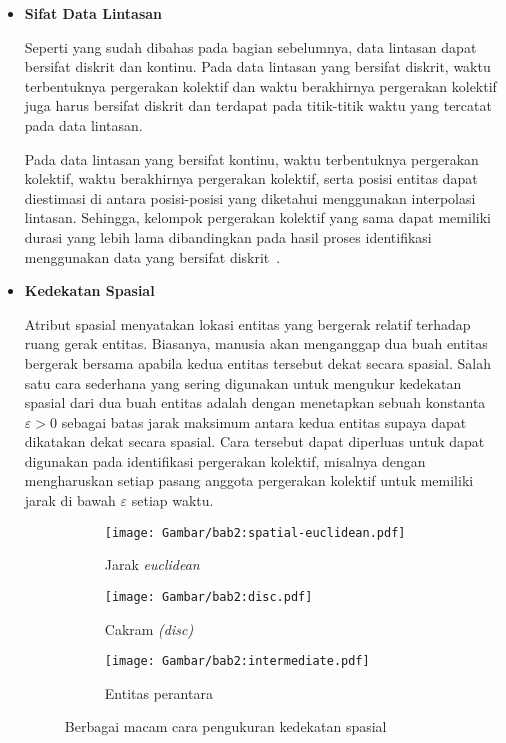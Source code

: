 \begin{itemize}
    \item \textbf{Sifat Data Lintasan}
    
    Seperti yang sudah dibahas pada bagian sebelumnya, data lintasan dapat bersifat diskrit dan kontinu. Pada data lintasan yang bersifat diskrit, waktu terbentuknya pergerakan kolektif dan waktu berakhirnya pergerakan kolektif juga harus bersifat diskrit dan terdapat pada titik-titik waktu yang tercatat pada data lintasan.
    
    Pada data lintasan yang bersifat kontinu, waktu terbentuknya pergerakan kolektif, waktu berakhirnya pergerakan kolektif, serta posisi entitas dapat diestimasi di antara posisi-posisi yang diketahui menggunakan interpolasi lintasan. Sehingga, kelompok pergerakan kolektif yang sama dapat memiliki durasi yang lebih lama dibandingkan pada hasil proses identifikasi menggunakan data yang bersifat diskrit~\cite{wiratma:trajectory}.

    \item \textbf{Kedekatan Spasial}
    
    Atribut spasial menyatakan lokasi entitas yang bergerak relatif terhadap ruang gerak entitas. Biasanya, manusia akan menganggap dua buah entitas bergerak bersama apabila kedua entitas tersebut dekat secara spasial. Salah satu cara sederhana yang sering digunakan untuk mengukur kedekatan spasial dari dua buah entitas adalah dengan menetapkan sebuah konstanta $\varepsilon > 0$ \iffalse \lionov{pake varepsilon ($\varepsilon$)} \fi sebagai batas jarak maksimum antara kedua entitas supaya dapat dikatakan dekat secara spasial. Cara tersebut dapat diperluas untuk dapat digunakan pada identifikasi pergerakan kolektif, misalnya dengan mengharuskan setiap pasang anggota pergerakan kolektif untuk memiliki jarak di bawah $\varepsilon$ setiap waktu.
    
    \begin{figure}[h]
        \centering
        \begin{subfigure}[h]{0.225\textwidth}
            \centering
            \texttt{[image: Gambar/bab2:spatial-euclidean.pdf]}
            \caption{Jarak \textit{euclidean}}
        \end{subfigure} \hspace{0.5cm}
        \begin{subfigure}[h]{0.225\textwidth}
            \centering
            \texttt{[image: Gambar/bab2:disc.pdf]}
            \caption{Cakram \textit{(disc)}}
        \end{subfigure} \hspace{0.5cm}
        \begin{subfigure}[h]{0.225\textwidth}
            \centering
            \texttt{[image: Gambar/bab2:intermediate.pdf]}
            \caption{Entitas perantara}
        \end{subfigure}
        \caption[Pengukuran kedekatan spasial]{Berbagai macam cara pengukuran kedekatan spasial}
        \label{bab2:spasial}
    \end{figure}
    

\end{itemize}

